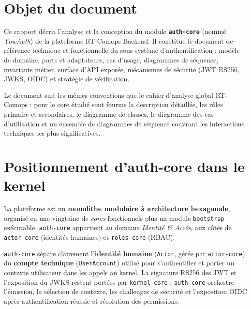 \documentclass[11pt,a4paper,oneside]{report}
\newcommand{\code}[1]{\texttt{\small #1}}
\begin{document}
\section{Objet du document}
Ce rapport décrit l'analyse et la conception du module \textbf{\code{auth-core}} (nommé
\emph{YowAuth}) de la plateforme RT-Comops Backend. Il constitue le document de référence
technique et fonctionnelle du sous-système d'authentification : modèle de domaine, ports et
adaptateurs, cas d'usage, diagrammes de séquence, invariants métier, surface d'API exposée,
mécanismes de sécurité (JWT RS256, JWKS, OIDC) et stratégie de vérification.

Le document suit les mêmes conventions que le cahier d'analyse global RT-Comops : pour le
core étudié sont fournis la description détaillée, les rôles primaire et secondaires, le
diagramme de classes, le diagramme des cas d'utilisation et un ensemble de diagrammes de
séquence couvrant les interactions techniques les plus significatives.

\section{Positionnement d'auth-core dans le kernel}
La plateforme est un \textbf{monolithe modulaire à architecture hexagonale}, organisé en
une vingtaine de \emph{cores} fonctionnels plus un module \code{bootstrap} exécutable.
\code{auth-core} appartient au domaine \emph{Identité \& Accès}, aux côtés de
\code{actor-core} (identités humaines) et \code{roles-core} (RBAC).

\begin{rolebox}
\code{auth-core} sépare clairement l'\textbf{identité humaine} (\code{Actor}, gérée par
\code{actor-core}) du \textbf{compte technique} (\code{UserAccount}) utilisé pour
s'authentifier et porter un contexte utilisateur dans les appels au kernel. La signature
RS256 des JWT et l'exposition du JWKS restent portées par \code{kernel-core} ;
\code{auth-core} orchestre l'émission, la sélection de contexte, les challenges de sécurité
et l'exposition OIDC après authentification réussie et résolution des permissions.
\end{rolebox}
\end{document}
